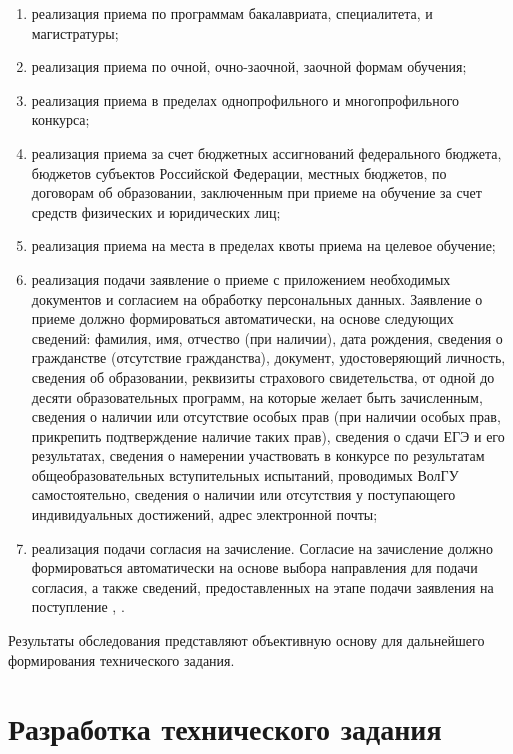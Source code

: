 \begin{enumerate} 
  \item реализация приема по программам бакалавриата, специалитета, и магистратуры;
  
  \item реализация приема по очной, очно-заочной, заочной формам обучения;
  
  \item реализация приема в пределах однопрофильного и многопрофильного конкурса;
  
  \item реализация приема за счет бюджетных ассигнований федерального бюджета, бюджетов субъектов Российской Федерации, местных бюджетов, по договорам об образовании, заключенным при приеме на обучение за счет средств физических и юридических лиц;
  
  \item реализация приема на места в пределах квоты приема на целевое обучение;
  
  \item реализация подачи заявление о приеме с приложением необходимых документов и согласием на обработку персональных данных. Заявление о приеме должно формироваться автоматически, на основе следующих сведений: фамилия, имя, отчество (при наличии), дата рождения, сведения о гражданстве (отсутствие гражданства), документ, удостоверяющий личность, сведения об образовании, реквизиты страхового свидетельства, от одной до десяти образовательных программ, на которые желает быть зачисленным, сведения о наличии или отсутствие особых прав (при наличии особых прав, прикрепить подтверждение наличие таких прав), сведения о сдачи ЕГЭ и его результатах, сведения о намерении участвовать в конкурсе по результатам общеобразовательных вступительных испытаний, проводимых ВолГУ самостоятельно, сведения о наличии или отсутствия у поступающего индивидуальных достижений, адрес электронной почты;
  
  \item реализация подачи согласия на зачисление. Согласие на зачисление должно формироваться автоматически на основе выбора направления для подачи согласия, а также сведений, предоставленных на этапе подачи заявления на поступление \cite{priembachelor}, \cite{priemspo}. 
\end{enumerate}

Результаты обследования представляют объективную основу для дальнейшего формирования технического задания.

\section{Разработка технического задания}

